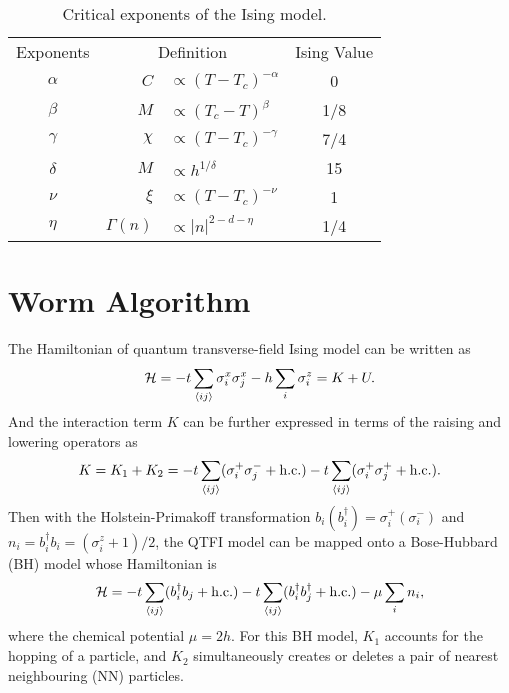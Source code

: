 \documentclass{article}
\theoremstyle{plain} \newtheorem{thm}{Theorem}[section]
\theoremstyle{definition} \newtheorem{df}{Definition}[section]
\theoremstyle{definition} \newtheorem{eg}{Example}
\theoremstyle{remark} \newtheorem*{rmk}{Remark}
\begin{document}
\begin{table}[htpb]
  \centering
  \caption{Critical exponents of the Ising model.}
  \label{tab:critical_exponents}
  \begin{tabular}{crlc}
    \toprule
    Exponents & \multicolumn{2}{c}{Definition} & Ising Value \\
    $\alpha$ & $C$ & $ \propto (T-T_c)^{-\alpha}$ & 0 \\
    $\beta$ & $M$ & $ \propto (T_c-T)^\beta$ & 1/8 \\
    $\gamma$ & $\chi$ & $ \propto (T-T_c)^{-\gamma}$ & 7/4 \\
    $\delta$ & $M$ & $ \propto h^{1/\delta}$ & 15 \\
    \midrule
    $\nu$ & $\xi$ & $ \propto (T-T_c)^{-\nu}$ & 1 \\
    $\eta$ & $\varGamma(n)$ & $ \propto |n|^{2-d-\eta}$ & 1/4 \\
    \bottomrule
  \end{tabular}
\end{table}

\section{Worm Algorithm}
The Hamiltonian of quantum transverse-field Ising model can be written as
\begin{equation}
  \mathcal{H} = -t\sum_{\braket{ij}}\sigma_i^x\sigma_j^x - h\sum_{i}\sigma_i^z = K+U.
\end{equation}
And the interaction term $K$ can be further expressed in terms of the raising and lowering operators as
\begin{equation}
  K = K_1+K_2 = -t\sum_{\braket{ij}}(\sigma_i^+\sigma_j^-+\text{h.c.})-t\sum_{\braket{ij}}(\sigma_i^+\sigma_j^++\text{h.c.}).
\end{equation}
Then with the Holstein-Primakoff transformation $b_i(b_i^\dag) = \sigma_i^+(\sigma_i^-)$ and $n_i = b_i^\dag b_i = (\sigma_i^z+1)/2$, the QTFI model can be mapped onto a Bose-Hubbard (BH) model whose Hamiltonian is
\begin{equation}
  \mathcal{H} = -t\sum_{\braket{ij}}(b_i^\dag b_j+\text{h.c.})-t\sum_{\braket{ij}}(b_i^\dag b_j^\dag+\text{h.c.})-\mu\sum_{i}n_i, 
\end{equation}
where the chemical potential $\mu = 2h$. For this BH model, $K_1$ accounts for the hopping of a particle, and $K_2$ simultaneously creates or deletes a pair of nearest neighbouring (NN) particles.
\end{document}
